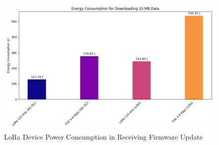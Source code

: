 \begin{figure}[h!]
    \centering
    \includegraphics[width=\columnwidth]{figures/loraRx.png}
    \caption{LoRa Device Power Consumption in Receiving Firmware Update}
    \label{fig:loraRx}
    
\end{figure}